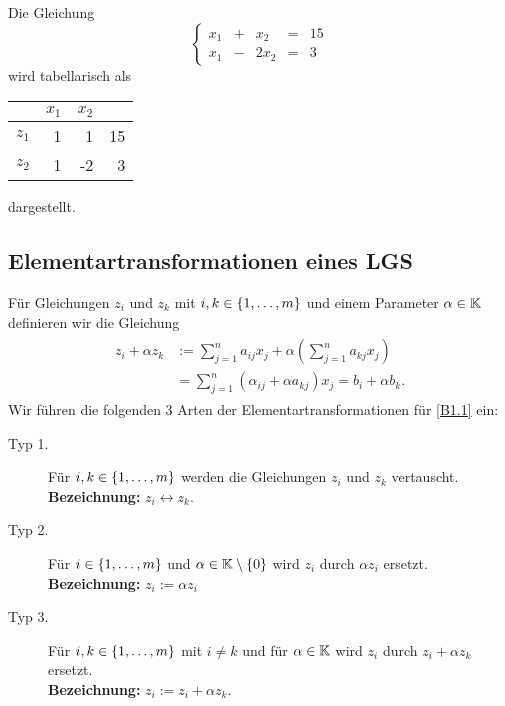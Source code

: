 \begin{bsp}
	Die Gleichung 
	\[
		 \left\{ \begin{array}{rcrcr}
		x_1 &+& x_2 &=& 15\\
		x_1 &-& 2x_2 &=& 3
	\end{array} \right. 
	\]
	wird tabellarisch als 
	\begin{center}
	\begin{tabular}{r|rr|r}
		& $ x_1 $ & $ x_2 $ & \\
		\hline
		$ z_1 $ & 1 & 1 & 15 \\
		$ z_2 $ & 1 & -2 & 3 \\
		\hline
	\end{tabular}
	\end{center} 
	dargestellt. 
\end{bsp}
 
\subsection{Elementartransformationen eines LGS}

Für Gleichungen $ z_i $ und $ z_k $ mit $ i,k \in \{ 1,\ldots,m \} $ und einem Parameter $ \alpha \in \mathbb K $ definieren wir die Gleichung
\begin{align}
\begin{split}
	z_i + \alpha z_k &:= \sum_{j=1}^{n} a_{ij} x_j + \alpha \left( \sum_{j=1}^{n} a_{kj}x_j \right) \\
	&= \sum_{j=1}^{n}\left( \alpha_{ij} + \alpha a_{kj} \right)x_j = b_i + \alpha b_k.
\end{split}
\end{align}
Wir führen die folgenden 3 Arten der Elementartransformationen für \eqref{B1.1} ein:
\begin{description}
	\item[Typ 1.]
		Für $ i,k \in \{ 1,\ldots,m \} $ werden die Gleichungen $ z_i $ und $ z_k $ vertauscht.
		\\ \textbf{Bezeichnung:} $ z_i \leftrightarrow z_k $.
	\item[Typ 2.]
		Für $ i \in \{ 1,\ldots,m \} $ und $ \alpha \in \mathbb K\setminus\{0\} $ wird $ z_i $ durch $ \alpha z_i $ ersetzt. \\ 
		\textbf{Bezeichnung:} $ z_i := \alpha z_i $ 
	\item[Typ 3.]
		Für $ i,k \in \{ 1,\ldots,m \} $ mit $ i \neq k $ und für $ \alpha \in \mathbb K $ wird $ z_i $ durch $ z_i + \alpha z_k $ ersetzt. \\ 
		\textbf{Bezeichnung:} $ z_i :=  z_i + \alpha z_k $.
\end{description}

